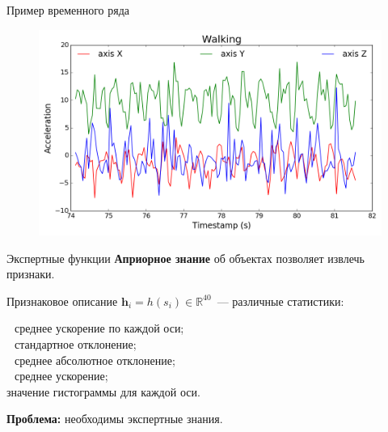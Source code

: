 \documentclass{beamer}
\begin{document}
\begin{frame}{Пример временного ряда}
	\begin{figure}[h]
		\centering
		\includegraphics[width=1\linewidth]{ts_example.png}
		\label{ts_example}
	\end{figure}
\end{frame}
\begin{frame}{Экспертные функции}
	\textbf{Априорное знание} об объектах позволяет извлечь признаки.
	\vfill
	\begin{block}{Признаковое описание}
		$\bm{h}_i = h\left(s_i\right)\in \mathbb{R}^{40}$~--- различные статистики:
		
		\hspace{0.5cm}$\:\,$ среднее ускорение по каждой оси;\\
		\hspace{0.5cm}$\:\,$ стандартное отклонение;\\
		\hspace{0.5cm}$\:\,$ среднее абсолютное отклонение;\\
		\hspace{0.5cm}$\:\,$ среднее ускорение;\\
		\hspace{0.5cm} значение гистограммы для каждой оси.
	\end{block}
	\vfill
	\textbf{Проблема:} необходимы экспертные знания.

\end{frame}
\end{document}
